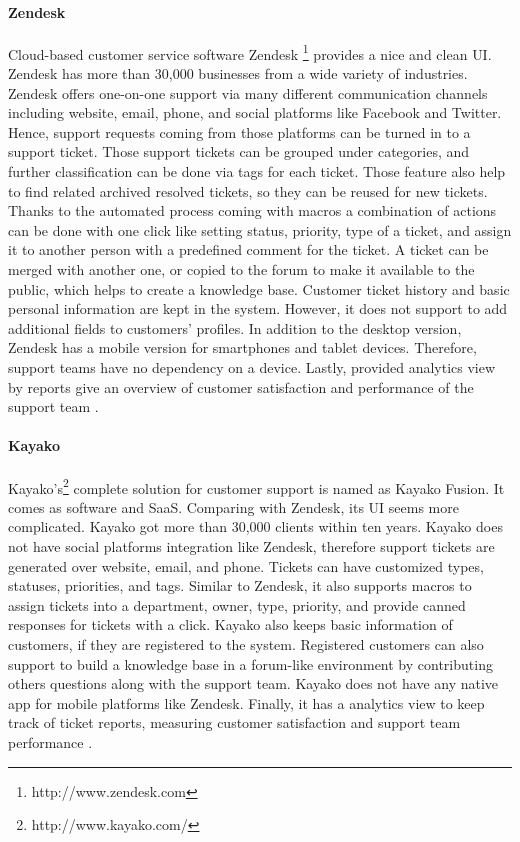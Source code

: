 \paragraph{Zendesk}
Cloud-based customer service software Zendesk \footnote{http://www.zendesk.com} provides a nice and clean \ac{UI}. Zendesk has more than 30,000 businesses from a wide variety of industries. Zendesk offers one-on-one support via many different communication channels including website, email, phone, and social platforms like Facebook and Twitter. Hence, support requests coming from those platforms can be turned in to a support ticket. Those support tickets can be grouped under categories, and further classification can be done via tags for each ticket. Those feature also help to find related archived resolved tickets, so they can be reused for new tickets. Thanks to the automated process coming with macros a combination of actions can be done with one click like setting status, priority, type of a ticket, and assign it to another person with a predefined comment for the ticket. A ticket can be merged with another one, or copied to the forum to make it available to the public, which helps to create a knowledge base. Customer ticket history and basic personal information are kept in the system. However, it does not support to add additional fields to customers' profiles. In addition to the desktop version, Zendesk has a mobile version for smartphones and tablet devices. Therefore, support teams have no dependency on a device. Lastly, provided analytics view by reports give an overview of customer satisfaction and performance of the support team \citep{Zendesk2013,Zendesk2013a}.

\paragraph{Kayako}
Kayako's\footnote{http://www.kayako.com/} complete solution for customer support is named as Kayako Fusion. It comes as software and \ac{SaaS}. Comparing with Zendesk, its \ac{UI} seems more complicated. Kayako got more than 30,000 clients within ten years. Kayako does not have social platforms integration like Zendesk, therefore support tickets are generated over website, email, and phone. Tickets can have customized types, statuses, priorities, and tags. Similar to Zendesk, it also supports macros to assign tickets into a department, owner, type, priority, and provide canned responses for tickets with a click. Kayako also keeps basic information of customers, if they are registered to the system. Registered customers can also support to build a knowledge base in a forum-like environment by contributing others questions along with the support team. Kayako does not have any native app for mobile platforms like Zendesk. Finally, it has a analytics view to keep track of ticket reports, measuring customer satisfaction and support team performance \citep{KayakoInc.2013,KayakoInc.2013a}.


